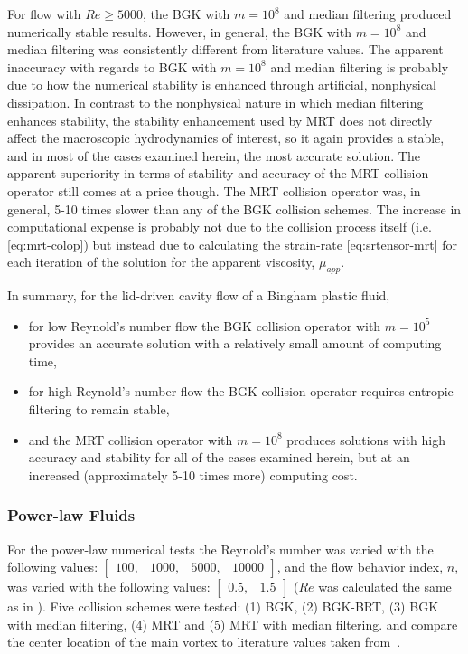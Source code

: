 For flow with $Re \ge 5000$, the BGK with $m = 10^8$ and median filtering produced numerically stable results.
However, in general, the BGK with $m = 10^8$ and median filtering was consistently different from literature values. 
The apparent inaccuracy with regards to BGK with $m = 10^8$ and median filtering is probably due to how the numerical stability is enhanced through artificial, nonphysical dissipation.
In contrast to the nonphysical nature in which median filtering enhances stability, the stability enhancement used by MRT does not directly affect the macroscopic hydrodynamics of interest, so it again provides a stable, and in most of the cases examined herein, the most accurate solution.
The apparent superiority in terms of stability and accuracy of the MRT collision operator still comes at a price though.
The MRT collision operator was, in general, 5-10 times slower than any of the BGK collision schemes.
The increase in computational expense is probably not due to the collision process itself (i.e. \eqref{eq:mrt-colop}) but instead due to calculating the strain-rate \eqref{eq:srtensor-mrt} for each iteration of the solution for the apparent viscosity, $\mu_{app}$.

In summary, for the lid-driven cavity flow of a Bingham plastic fluid, 
\begin{itemize}
    \item for low Reynold's number flow the BGK collision operator with $m = 10^5$ provides an accurate solution with a relatively small amount of computing time,
    \item for high Reynold's number flow the BGK collision operator requires entropic filtering to remain stable,
    \item and the MRT collision operator with $m = 10^8$ produces solutions with high accuracy and stability for all of the cases examined herein, but at an increased (approximately 5-10 times more) computing cost.
\end{itemize} 



\subsubsection{Power-law Fluids}

For the power-law numerical tests the Reynold's number was varied with the following values: $\begin{bmatrix}100,&1000,&5000,&10000\end{bmatrix}$, and the flow behavior index, $n$, was varied with the following values: $\begin{bmatrix}0.5,&1.5\end{bmatrix}$ ($Re$ was calculated the same as in ).
Five collision schemes were tested: (1) BGK, (2) BGK-BRT, (3) BGK with median filtering, (4) MRT and (5) MRT with median filtering.
 and  compare the center location of the main vortex to literature values taken from~\citet{li2014simulation}.

